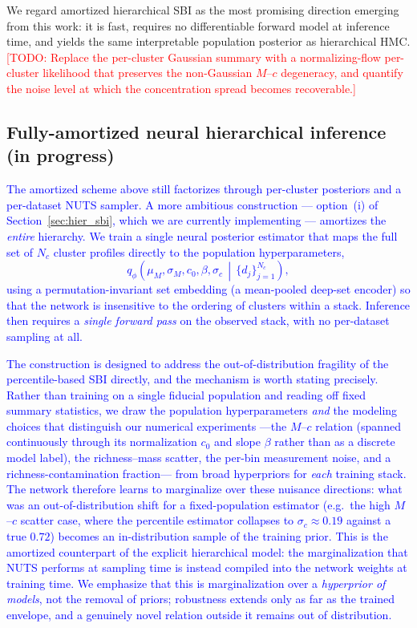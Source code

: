 \documentclass[11pt]{article}
\newcommand{\todo}[1]{\textcolor{red}{[TODO: #1]}}
\newcommand{\prelim}[1]{\textcolor{blue}{#1}}  %
\begin{document}
We regard amortized hierarchical SBI as the most promising direction emerging from this work: it is
fast, requires no differentiable forward model at inference time, and yields the same interpretable
population posterior as hierarchical HMC. \todo{Replace the per-cluster Gaussian summary with a
normalizing-flow per-cluster likelihood that preserves the non-Gaussian $M$--$c$ degeneracy, and
quantify the noise level at which the concentration spread becomes recoverable.}

\subsection{Fully-amortized neural hierarchical inference (in progress)}
\label{sec:neural_hbi}

\prelim{The amortized scheme above still factorizes through per-cluster posteriors and a per-dataset
NUTS sampler. A more ambitious construction --- option~(i) of Section~\ref{sec:hier_sbi}, which we
are currently implementing --- amortizes the \emph{entire} hierarchy. We train a single neural
posterior estimator that maps the full set of $N_c$ cluster profiles directly to the population
hyperparameters,
\begin{equation}
q_\phi\!\left(\mu_M,\sigma_M,c_0,\beta,\sigma_c \,\middle|\, \{d_j\}_{j=1}^{N_c}\right),
\end{equation}
using a permutation-invariant set embedding (a mean-pooled deep-set encoder) so that the network is
insensitive to the ordering of clusters within a stack. Inference then requires a \emph{single
forward pass} on the observed stack, with no per-dataset sampling at all.}

\prelim{The construction is designed to address the out-of-distribution fragility of the
percentile-based SBI directly, and the mechanism is worth stating precisely. Rather than training on
a single fiducial population and reading off fixed summary statistics, we draw the population
hyperparameters \emph{and} the modeling choices that distinguish our numerical experiments ---the
$M$--$c$ relation (spanned continuously through its normalization $c_0$ and slope $\beta$ rather than
as a discrete model label), the richness--mass scatter, the per-bin measurement noise, and a
richness-contamination fraction--- from broad hyperpriors for \emph{each} training stack. The
network therefore learns to marginalize over these nuisance directions: what was an out-of-distribution
shift for a fixed-population estimator (e.g.\ the high $M$--$c$ scatter case, where the percentile
estimator collapses to $\sigma_c\approx0.19$ against a true $0.72$) becomes an in-distribution
sample of the training prior. This is the amortized counterpart of the explicit hierarchical model:
the marginalization that NUTS performs at sampling time is instead compiled into the network weights
at training time. We emphasize that this is marginalization over a \emph{hyperprior of models}, not
the removal of priors; robustness extends only as far as the trained envelope, and a genuinely novel
relation outside it remains out of distribution.}
\end{document}
